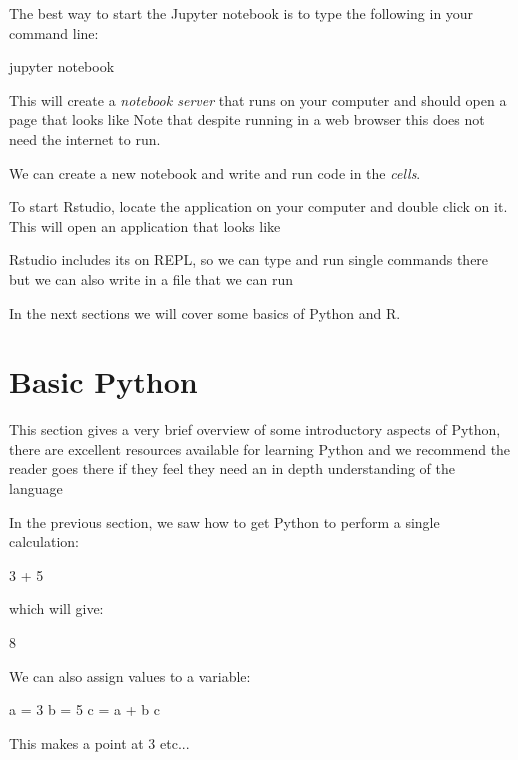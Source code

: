 The best way to start the Jupyter notebook is to type the following in your
command line:

\begin{cliin}
jupyter notebook
\end{cliin}

This will create a \textit{notebook server} that runs on your computer and
should open a page that looks like %
Note that despite running in a web browser this does not need the internet to
run.

We can create a new notebook and write and run code in the \textit{cells}.

To start Rstudio, locate the application on your computer and double click on
it. This will open an application that looks like %

Rstudio includes its on REPL, so we can type and run single commands there but
we can also write in a file that we can run

In the next sections we will cover some basics of Python and R.

\section{Basic Python}\label{sec:basic-python}

This section gives a very brief overview of some introductory aspects of Python,
there are excellent resources available for learning Python and we recommend the
reader goes there if they feel they need an in depth understanding of the
language %

In the previous section, we saw how to get Python to perform a single
calculation:

\begin{pyin}
3 + 5
\end{pyin}

which will give:

\begin{pyout}
8
\end{pyout}

We can also assign values to a variable:

\begin{pyin}
a = 3
b = 5
c = a + b
c
\end{pyin}

\begin{explanation}
This makes a point at 3 etc...  %
\end{explanation}

